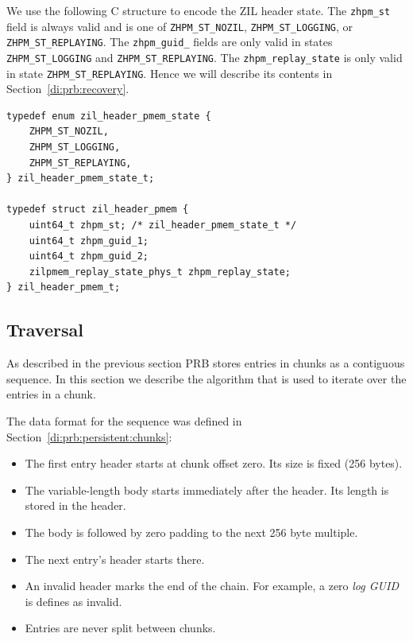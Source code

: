 \documentclass[12pt,a4paper,twoside]{book}
\begin{document}
We use the following C structure to encode the ZIL header state.
The \lstinline{zhpm_st} field is always valid and is one of \lstinline{ZHPM_ST_NOZIL}, \lstinline{ZHPM_ST_LOGGING}, or \lstinline{ZHPM_ST_REPLAYING}.
The \lstinline{zhpm_guid_} fields are only valid in states \lstinline{ZHPM_ST_LOGGING} and \lstinline{ZHPM_ST_REPLAYING}.
The \lstinline{zhpm_replay_state} is only valid in state \lstinline{ZHPM_ST_REPLAYING}.
Hence we will describe its contents in Section~\ref{di:prb:recovery}.
\begin{lstlisting}
typedef enum zil_header_pmem_state {
    ZHPM_ST_NOZIL,
    ZHPM_ST_LOGGING,
    ZHPM_ST_REPLAYING,
} zil_header_pmem_state_t;

typedef struct zil_header_pmem {
    uint64_t zhpm_st; /* zil_header_pmem_state_t */
    uint64_t zhpm_guid_1;
    uint64_t zhpm_guid_2;
    zilpmem_replay_state_phys_t zhpm_replay_state;
} zil_header_pmem_t;
\end{lstlisting}


\subsection{Traversal}\label{di:prb:traversal}
As described in the previous section PRB stores entries in chunks as a contiguous sequence.
In this section we describe the algorithm that is used to iterate over the entries in a chunk.

The data format for the sequence was defined in Section~\ref{di:prb:persistent:chunks}:
\begin{itemize}[noitemsep]
    \item The first entry header starts at chunk offset zero. Its size is fixed (256 bytes).
    \item The variable-length body starts immediately after the header. Its length is stored in the header.
    \item The body is followed by zero padding to the next 256 byte multiple.
    \item The next entry's header starts there.
    \item An invalid header marks the end of the chain. For example, a zero \textit{log GUID} is defines as invalid.
    \item Entries are never split between chunks.
\end{itemize}
\end{document}
